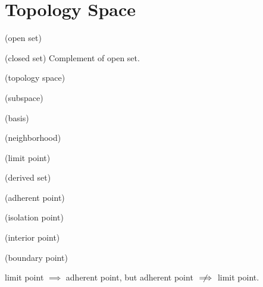 \chapter{Topology Space}


\begin{definition}
(open set)
\end{definition}

\begin{definition}
(closed set) Complement of open set. 
\end{definition}

\begin{definition}
(topology space)
\end{definition}

\begin{definition}
(subspace)
\end{definition}

\begin{definition}
(basis)
\end{definition}

\begin{definition}
(neighborhood)
\end{definition}

\begin{definition}
(limit point)
\end{definition}

\begin{definition}
(derived set)
\end{definition}

\begin{definition}
(adherent point)
\end{definition}

\begin{definition}
(isolation point)
\end{definition}

\begin{definition}
(interior point)
\end{definition}

\begin{definition}
(boundary point)
\end{definition}

\begin{warning}
limit point $\implies$ adherent point, but adherent point $\centernot\implies$ limit point.
\end{warning}

